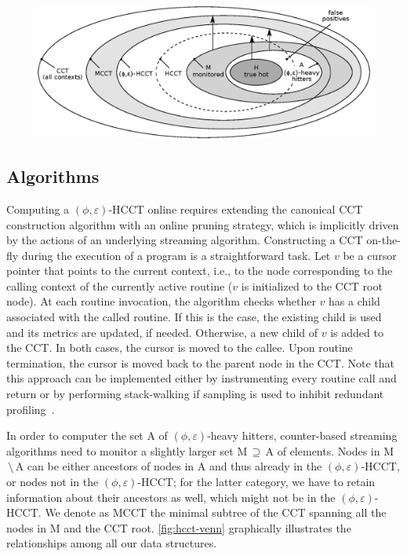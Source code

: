 \ifdefined\noauthorea
\begin{figure}[ht]
\begin{center}
\includegraphics[width=0.95\columnwidth]{figures/hcct-venn/hcct-venn.eps}
\caption{\protect}
\end{center}
\end{figure}
\fi

\subsection{Algorithms}
\label{ss:hcct-algorithms}

Computing a $(\phi,\varepsilon)$-HCCT online requires extending the canonical CCT construction algorithm with an online pruning strategy, which is implicitly driven by the actions of an underlying streaming algorithm. Constructing a CCT on-the-fly during the execution of a program is a straightforward task. Let $v$ be a cursor pointer that points to the current context, i.e., to the node corresponding to the calling context of the currently active routine ($v$ is initialized to the CCT root node). At each routine invocation, the algorithm checks whether $v$ has a child associated with the called routine. If this is the case, the existing child is used and its metrics are updated, if needed. Otherwise, a new child of $v$ is added to the CCT. In both cases, the cursor is moved to the callee. Upon routine termination, the cursor is moved back to the parent node in the CCT. Note that this approach can be implemented either by instrumenting every routine call and return or by performing stack-walking if sampling is used to inhibit redundant profiling~\cite{Arnold00,Whaley00,Zhuang06}.

In order to computer the set A of $(\phi,\varepsilon)$-heavy hitters, counter-based streaming algorithms need to monitor a slightly larger set M$\,\supseteq\,$A of elements. Nodes in M$\,\setminus\,$A can be either ancestors of nodes in A and thus already in the $(\phi,\varepsilon)$-HCCT, or nodes not in the $(\phi,\varepsilon)$-HCCT; for the latter category, we have to retain information about their ancestors as well, which might not be in the $(\phi,\varepsilon)$-HCCT. We denote as MCCT the minimal subtree of the CCT spanning all the nodes in M and the CCT root. \myfigure\ref{fig:hcct-venn} graphically illustrates the relationships among all our data structures.

